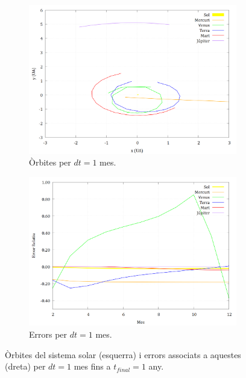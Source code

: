 \documentclass[10pt, twoside, a4paper]{article}
\begin{document}
\begin{figure}[h]
    \centering
    
    \begin{subfigure}[b]{0.495\linewidth}
        \centering
        \includegraphics[width=\linewidth]{../sist_solar/orbites_euler_1_d1mes.png}
        \caption{Òrbites per $dt=1$ mes.}
    \end{subfigure}
    \hfill
    \begin{subfigure}[b]{0.495\linewidth}
        \centering
        \includegraphics[width=\linewidth]{../Error/error_1_mes.png}
        \caption{Errors per $dt=1$ mes.}
    \end{subfigure}
    \caption{Òrbites del sistema solar (esquerra) i errors associats a aquestes (dreta) per $dt=1$ mes fins a $t_{final}=1$ any.}
    \label{fig3}
\end{figure}
\end{document}
